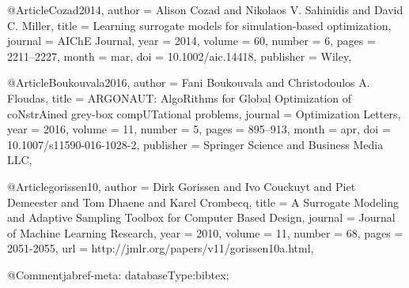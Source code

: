 @Article{Cozad2014,
  author    = {Alison Cozad and Nikolaos V. Sahinidis and David C. Miller},
  title     = {Learning surrogate models for simulation-based optimization},
  journal   = {{AIChE} Journal},
  year      = {2014},
  volume    = {60},
  number    = {6},
  pages     = {2211--2227},
  month     = {mar},
  doi       = {10.1002/aic.14418},
  publisher = {Wiley},
}

@Article{Boukouvala2016,
  author    = {Fani Boukouvala and Christodoulos A. Floudas},
  title     = {{ARGONAUT}: {AlgoRithms} for Global Optimization of {coNstrAined} grey-box {compUTational} problems},
  journal   = {Optimization Letters},
  year      = {2016},
  volume    = {11},
  number    = {5},
  pages     = {895--913},
  month     = {apr},
  doi       = {10.1007/s11590-016-1028-2},
  publisher = {Springer Science and Business Media {LLC}},
}

@Article{gorissen10,
  author  = {Dirk Gorissen and Ivo Couckuyt and Piet Demeester and Tom Dhaene and Karel Crombecq},
  title   = {A Surrogate Modeling and Adaptive Sampling Toolbox for Computer Based Design},
  journal = {Journal of Machine Learning Research},
  year    = {2010},
  volume  = {11},
  number  = {68},
  pages   = {2051-2055},
  url     = {http://jmlr.org/papers/v11/gorissen10a.html},
}

@Comment{jabref-meta: databaseType:bibtex;}
